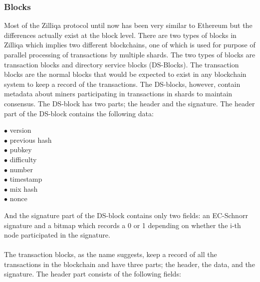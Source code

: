 \documentclass[a4paper,twoside,phd]{BYUPhys}
\begin{document}
\subsubsection{Blocks}
Most of the Zilliqa protocol until now has been very similar to Ethereum but the differences actually exist at the block level. There are two types of blocks in Zilliqa which implies two different blockchains, one of which is used for purpose of parallel processing of transactions by multiple shards. The two types of blocks are transaction blocks and directory service blocks (DS-Blocks)\cite{}. The transaction blocks are the normal blocks that would be expected to exist in any blockchain system to keep a record of the transactions. The DS-blocks, however, contain metadata about miners participating in transactions in shards to maintain consensus\cite{}. The DS-block has two parts; the header and the signature. The header part of the DS-block contains the following data\cite{}:
\begin{description}
\item[$\bullet$ version]
\item[$\bullet$ previous hash]
\item[$\bullet$ pubkey]
\item[$\bullet$ difficulty]
\item[$\bullet$ number]
\item[$\bullet$ timestamp]
\item[$\bullet$ mix hash]
\item[$\bullet$ nonce]
\end{description}
And the signature part of the DS-block contains only two fields: an EC-Schnorr signature and a bitmap which records a 0 or 1 depending on whether the i-th node participated in the signature\cite{}.
\\
\\
The transaction blocks, as the name suggests,  keep a record of all the transactions in the blockchain and have three parts; the header, the data, and the signature. The header part consists of the following fields\cite{}:
\end{document}
